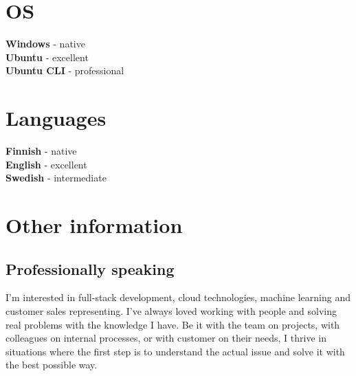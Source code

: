 \documentclass[letterpaper]{twentysecondcv}
\begin{document}



\begin{minipage}[t]{0.5\textwidth}
  \vspace{-\baselineskip} %

  \section{OS}

  \textbf{Windows} - native \\
  \textbf{Ubuntu} - excellent \\
  \textbf{Ubuntu CLI} - professional


\end{minipage}
\hfill
\begin{minipage}[t]{0.5\textwidth}
  \vspace{-\baselineskip} %

  \section{Languages}

  \textbf{Finnish} - native \\
  \textbf{English} - excellent \\
  \textbf{Swedish} - intermediate \\

\end{minipage}



\section{Other information}


\subsection{Professionally speaking}

I'm interested in full-stack development, cloud technologies, machine learning and customer sales representing.
I've always loved working with people and solving real problems with the knowledge I have.
Be it with the team on projects, with colleagues on internal processes, or with customer on their needs,
I thrive in situations where the first step is to understand the actual issue and solve it with the best possible way.
\end{document}
